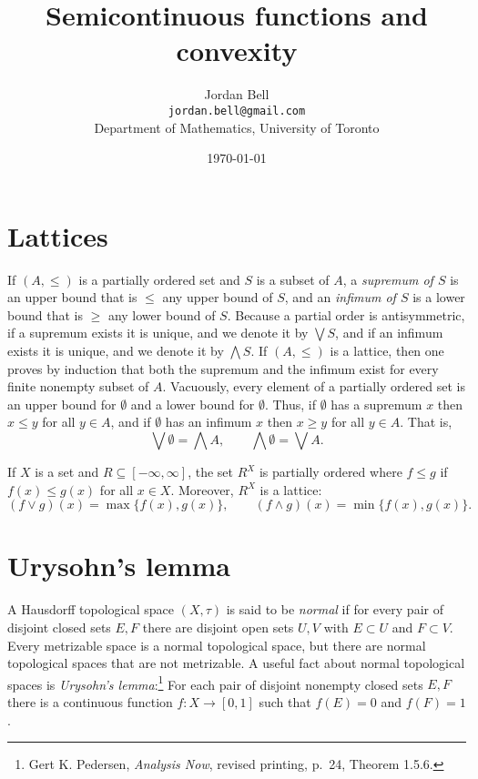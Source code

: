 \documentclass{article}
\theoremstyle{definition}
\begin{document}
\title{Semicontinuous functions and convexity}
\author{Jordan Bell\\ \texttt{jordan.bell@gmail.com}\\Department of Mathematics, University of Toronto}
\date{\today}

\maketitle

\section{Lattices}
If $(A,\leq)$ is a partially ordered set and $S$ is a subset of $A$, a {\em supremum of $S$} is an upper bound that is $\leq$ any upper
bound of $S$, and an {\em infimum of $S$} is a lower bound that is $\geq$ any lower bound of $S$. 
Because a partial order is antisymmetric, if a supremum exists it is unique, and we denote it by $\bigvee S$, and if an infimum exists it is unique, and
we denote it by $\bigwedge S$.
 If $(A,\leq)$ is a lattice, then one proves by induction that both the supremum and the infimum exist for every finite nonempty subset of $A$. 
Vacuously, every element of a partially ordered set is an upper bound for $\emptyset$ and a lower bound for $\emptyset$. Thus, if $\emptyset$ has a supremum $x$
then $x \leq y$ for all $y \in A$, and if $\emptyset$ has an infimum $x$ then $x \geq y$ for all $y \in A$. That is,
\[
\bigvee \emptyset = \bigwedge A, \qquad \bigwedge \emptyset =  \bigvee A.
\]


If $X$ is a set and $R \subseteq [-\infty,\infty]$, the set $R^X$ is partially ordered where $f \leq g$ if
$f(x) \leq g(x)$ for all $x \in X$. Moreover,  $R^X$  is a lattice: 
\[
(f \vee g)(x) = \max \{f(x),g(x)\}, \qquad (f \wedge g)(x) = \min\{ f(x),g(x)\}.
\]


\section{Urysohn's lemma}
A Hausdorff topological space $(X,\tau)$ is said to be  {\em normal} if for every pair of disjoint closed sets $E,F$ there are disjoint open sets $U,V$ with
$E \subset U$ and $F \subset V$. Every metrizable space is a normal topological space, but there are normal topological spaces that are not metrizable. 
A useful fact about normal topological spaces is {\em Urysohn's lemma}:\footnote{Gert K. Pedersen,
{\em Analysis Now}, revised printing, p.~24, Theorem 1.5.6.} For each pair of disjoint nonempty closed sets $E,F$ there is a continuous function
$f:X \to [0,1]$ such that $f(E)=0$ and $f(F)=1$.
\end{document}
